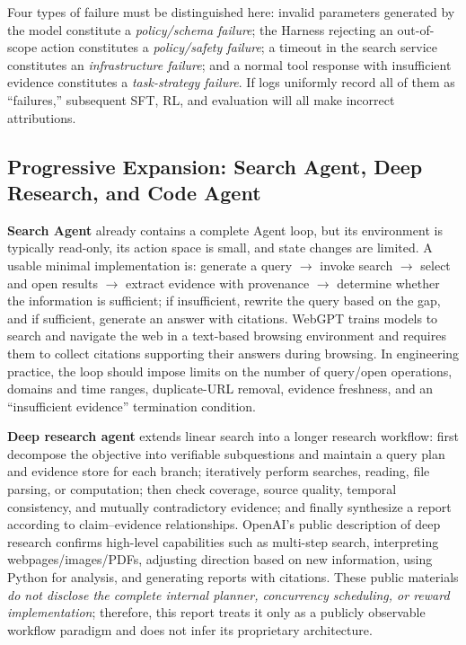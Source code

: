 \documentclass[10pt,a4paper,UTF8,fontset=none]{ctexart}
\begin{document}
Four types of failure must be distinguished here: invalid parameters generated by the model constitute a \emph{policy/schema failure}; the Harness rejecting an out-of-scope action constitutes a \emph{policy/safety failure}; a timeout in the search service constitutes an \emph{infrastructure failure}; and a normal tool response with insufficient evidence constitutes a \emph{task-strategy failure}. If logs uniformly record all of them as ``failures,'' subsequent SFT, RL, and evaluation will all make incorrect attributions.

\subsection{Progressive Expansion: Search Agent, Deep Research, and Code Agent}

\textbf{Search Agent} already contains a complete Agent loop, but its environment is typically read-only, its action space is small, and state changes are limited. A usable minimal implementation is: generate a query $\rightarrow$ invoke search $\rightarrow$ select and open results $\rightarrow$ extract evidence with provenance $\rightarrow$ determine whether the information is sufficient; if insufficient, rewrite the query based on the gap, and if sufficient, generate an answer with citations. WebGPT trains models to search and navigate the web in a text-based browsing environment and requires them to collect citations supporting their answers during browsing\cite{nakano2021webgpt}. In engineering practice, the loop should impose limits on the number of query/open operations, domains and time ranges, duplicate-URL removal, evidence freshness, and an ``insufficient evidence'' termination condition.

\textbf{Deep research agent} extends linear search into a longer research workflow: first decompose the objective into verifiable subquestions and maintain a query plan and evidence store for each branch; iteratively perform searches, reading, file parsing, or computation; then check coverage, source quality, temporal consistency, and mutually contradictory evidence; and finally synthesize a report according to claim--evidence relationships. OpenAI's public description of deep research confirms high-level capabilities such as multi-step search, interpreting webpages/images/PDFs, adjusting direction based on new information, using Python for analysis, and generating reports with citations\cite{openai2025deepresearch}. These public materials \emph{do not disclose the complete internal planner, concurrency scheduling, or reward implementation}; therefore, this report treats it only as a publicly observable workflow paradigm and does not infer its proprietary architecture.
\end{document}
